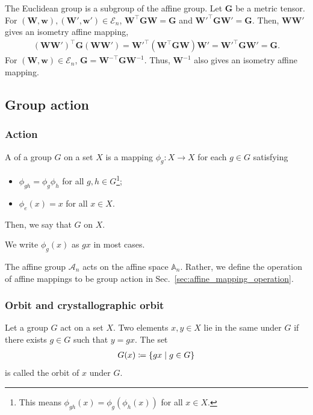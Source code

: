 The Euclidean group is a subgroup of the affine group.
Let $\bm{G}$ be a metric tensor.
For $(\bm{W}, \bm{w}), (\bm{W}', \bm{w}') \in \mathcal{E}_{n}$, $\bm{W}^{\top} \bm{G} \bm{W} = \bm{G}$ and $\bm{W}'^{\top} \bm{G} \bm{W}' = \bm{G}$.
Then, $\bm{W}\bm{W}'$ gives an isometry affine mapping,
\begin{align*}
  (\bm{W}\bm{W}')^{\top} \bm{G} (\bm{W}\bm{W}')
    = \bm{W}'^{\top} (\bm{W}^{\top} \bm{G} \bm{W}) \bm{W}'
    = \bm{W}'^{\top} \bm{G} \bm{W}'
    = \bm{G}.
\end{align*}
For $(\bm{W}, \bm{w}) \in \mathcal{E}_{n}$, $\bm{G} = \bm{W}^{-\top} \bm{G} \bm{W}^{-1}$.
Thus, $\bm{W}^{-1}$ also gives an isometry affine mapping.

\subsection{Group action}

\subsubsection{Action}

\begin{screen}
  \begin{defn}[action]
    A  of a group $G$ on a set $X$ is a mapping $\phi_{g}: X \to X$ for each $g \in G$ satisfying
    \begin{itemize}
      \item $\phi_{gh} = \phi_{g} \phi_{h}$ for all $g, h \in G$\footnote{
        This means $\phi_{gh}(x) = \phi_{g} (\phi_{h}(x))$ for all $x \in X$.
      };
      \item $\phi_{e}(x) = x$ for all $x \in X$.
    \end{itemize}
    Then, we say that $G$  on $X$.
  \end{defn}
\end{screen}
We write $\phi_{g}(x)$ as $gx$ in most cases.

The affine group $\mathcal{A}_{n}$ acts on the affine space $\mathbb{A}_{n}$.
Rather, we define the operation of affine mappings to be group action in Sec.~\ref{sec:affine_mapping_operation}.

\subsubsection{Orbit and crystallographic orbit}

\begin{screen}
  \begin{defn}[orbit]
    Let a group $G$ act on a set $X$.
    Two elements $x, y \in X$ lie in the same  under $G$ if there exists $g \in G$ such that $y = gx$.
    The set
    \begin{align}
      G(x) \coloneqq \left\{ gx \mathrel{}\middle|\mathrel{} g \in G \right\}
    \end{align}
    is called the orbit of $x$ under $G$.
  \end{defn}
\end{screen}

